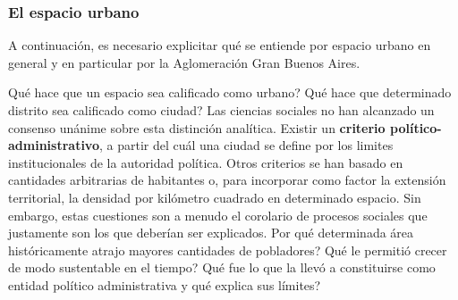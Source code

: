 
\subsubsection{El espacio urbano}

A continuación, es necesario explicitar qué se entiende por espacio urbano en general y en particular por la Aglomeración Gran Buenos Aires. 

Qué hace que un espacio sea calificado como urbano? Qué hace que determinado distrito sea calificado como ciudad? Las ciencias sociales no han alcanzado un consenso unánime sobre esta distinción analítica. Existir un \textbf{criterio político-administrativo}, a partir del cuál una ciudad se define por los limites institucionales de la autoridad política. Otros criterios se han basado en cantidades arbitrarias de habitantes o, para incorporar como factor la extensión territorial, la densidad por kilómetro cuadrado en determinado espacio. Sin embargo, estas cuestiones son a menudo el corolario de procesos sociales que justamente son los que deberían ser explicados. Por qué determinada área históricamente atrajo mayores cantidades de pobladores? Qué le permitió crecer de modo sustentable en el tiempo? Qué fue lo que la llevó a constituirse como entidad político administrativa y qué explica sus límites?

